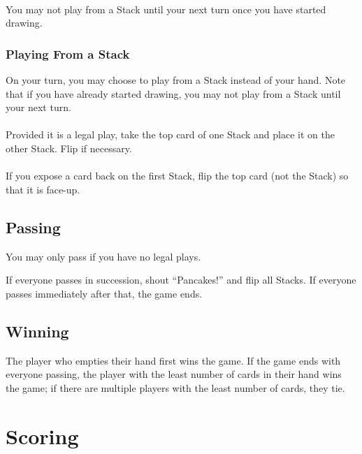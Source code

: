 \documentclass{article}
\begin{document}
\paragraph{}
You may not play from a Stack until your next turn once you have started drawing.

\subsubsection{Playing From a Stack}
\label{sec:fromstack}

On your turn, you may choose to play from a Stack instead of your hand. Note that if you have already started drawing, you may not play from a Stack until your next turn.

\paragraph{}
Provided it is a legal play, take the top card of one Stack and place it on the other Stack. Flip if necessary.

\paragraph{}
If you expose a card back on the first Stack, flip the top card (not the Stack) so that it is face-up.

\subsection{Passing}

You may only pass if you have no legal plays.

If everyone passes in succession, shout ``Pancakes!'' and flip all Stacks. If everyone passes immediately after that, the game ends.

\subsection{Winning}

The player who empties their hand first wins the game. If the game ends with everyone passing, the player with the least number of cards in their hand wins the game; if there are multiple players with the least number of cards, they tie.

\section{Scoring}
\end{document}
